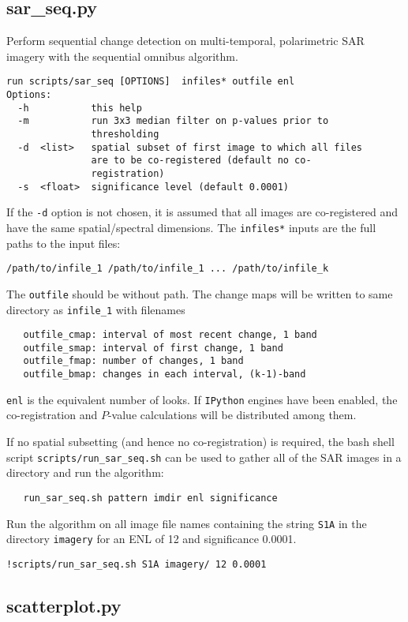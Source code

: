 \documentclass{paper}
\begin{document}
\subsection*{sar\_seq.py}
Perform sequential change detection on multi-temporal, polarimetric SAR imagery with the sequential omnibus algorithm.
\begin{verbatim}
run scripts/sar_seq [OPTIONS]  infiles* outfile enl
Options:
  -h           this help
  -m           run 3x3 median filter on p-values prior to
               thresholding
  -d  <list>   spatial subset of first image to which all files
               are to be co-registered (default no co-
               registration)
  -s  <float>  significance level (default 0.0001)
\end{verbatim}
If the {\tt -d} option is not chosen, it is assumed that all images are co-registered and have the same spatial/spectral dimensions. The {\tt infiles*} inputs are the full paths to the input files:
\begin{lstlisting}
/path/to/infile_1 /path/to/infile_1 ... /path/to/infile_k
\end{lstlisting}
The {\tt outfile} should be without path. The change maps will be written to same directory as {\tt infile\_1} with filenames
\begin{lstlisting}
   outfile_cmap: interval of most recent change, 1 band
   outfile_smap: interval of first change, 1 band
   outfile_fmap: number of changes, 1 band
   outfile_bmap: changes in each interval, (k-1)-band
\end{lstlisting}
{\tt enl} is the equivalent number of looks. If {\tt IPython} engines have been enabled, the co-registration and $P$-value calculations will be distributed among them.


If no spatial subsetting (and hence no co-registration) is required, the bash shell script {\tt scripts/run\_sar\_seq.sh} can be used to gather all of the SAR images in a directory and run the algorithm:
\begin{verbatim}
   run_sar_seq.sh pattern imdir enl significance
\end{verbatim}


 Run the algorithm on all image file names containing the string {\tt S1A} in the directory {\tt imagery} for an ENL of 12 and significance 0.0001.
\begin{lstlisting}
!scripts/run_sar_seq.sh S1A imagery/ 12 0.0001
\end{lstlisting}


\subsection*{scatterplot.py}
\end{document}

